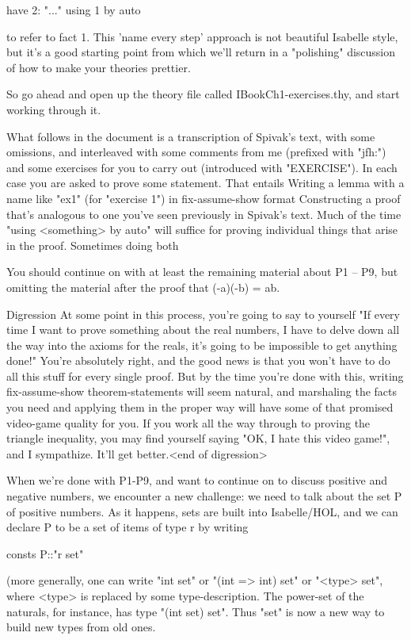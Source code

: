    have 2: "..." using 1 by auto

to refer to fact 1. This 'name every step' approach is not beautiful Isabelle style, but it's a good starting point from which we'll return in a "polishing" discussion of how to make your theories prettier. 

So go ahead and open up the theory file called IBookCh1-exercises.thy, and start working through it. 

What follows in the document is a transcription of Spivak's text, with some omissions, and interleaved with some comments from me (prefixed with "jfh:") and some exercises for you to carry out (introduced with "EXERCISE"). In each case you are asked to prove some statement. That entails
Writing a lemma with a name like "ex1" (for "exercise 1") in fix-assume-show format
Constructing a proof that's analogous to one you've seen previously in Spivak's text. Much of the time "using <something> by auto" will suffice for proving individual things that arise in the proof. 
Sometimes doing both

You should continue on with at least the remaining material about P1 -- P9, but omitting the material after the proof that (-a)(-b) = ab. 

Digression At some point in this process, you're going to say to yourself "If every time I want to prove something about the real numbers, I have to delve down all the way into the axioms for the reals, it's going to be impossible to get anything done!" You're absolutely right, and the good news is that you won't have to do all this stuff for every single proof. But by the time you're done with this, writing fix-assume-show theorem-statements will seem natural, and marshaling the facts you need and applying them in the proper way will have some of that promised video-game quality for you. If you work all the way through to proving the triangle inequality, you may find yourself saying "OK, I hate this video game!", and I sympathize. It'll get better.<end of digression>

When we're done with P1-P9, and want to continue on to discuss positive and negative numbers, we encounter a new challenge: we need to talk about the set P of positive numbers. As it happens, sets are built into Isabelle/HOL, and we can declare P to be a set of items of type r by writing 

consts
P::"r set"

(more generally, one can write "int set" or "(int => int) set" or "<type> set", where <type> is replaced by some type-description. The power-set of the naturals, for instance, has type "(int set) set". Thus "set" is now a new way to build new types from old ones. 

